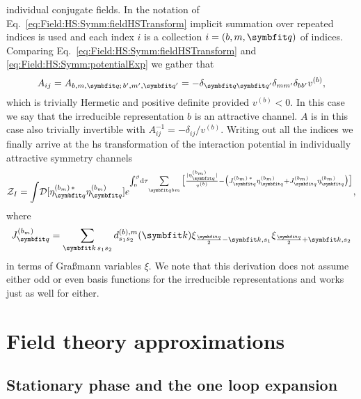 individual conjugate fields. In the notation of Eq.~\eqref{eq:Field:HS:Symm:fieldHSTransform} implicit summation over repeated indices is used and each index $i$ is a collection $i = (b,m,\v{q})$ of indices.
Comparing Eq.~\eqref{eq:Field:HS:Symm:fieldHSTransform} and \eqref{eq:Field:HS:Symm:potentialExp} we gather that
\begin{equation}
    \label{eq:Field:HS:Symm:Matrix}
    A_{ij} = A_{b,m,\v{q};\,b',m',\v{q}'} = -\delta_{\v{q}\v{q}'}\delta_{mm'}\delta_{bb'}v^{(b)},
\end{equation}
which is trivially Hermetic and positive definite provided $v^{(b)}<0$. In this case we say that the irreducible representation $b$ is an
attractive channel. $A$ is in this case also trivially invertible with $A_{ij}^{-1} = -\delta_{ij}/v^{(b)}$.
Writing out all the indices we finally arrive at the \ac{hs} transformation of the interaction potential in individually
attractive symmetry channels
\begin{equation}
    \label{eq:Field:HS:Symm:HSTransformedPotentialExp}
    \mathcal{Z}_I = \int\!\mathcal{D}[\eta_\v{q}^{(b_m)\,\ast}\eta_\v{q}^{(b_m)}]e^{\int_0^\beta\!\mathrm{d}\tau\!\sum\limits_{\v{q}bm}\big[\frac{|\eta_\v{q}^{(b_m)}|}{v^{(b)}} - \big(J_\v{q}^{(b_m)\,\ast}\eta_\v{q}^{(b_m)} + J_\v{q}^{(b_m)}\eta_\v{q}^{(b_m)}\big)\big]},
\end{equation}
where
\begin{equation}
    \label{eq:Field:HS:Symm:JRedef}
    J^{(b_m)}_\v{q} = \sum_{\v{k}\,s_1s_2}d_{s_1s_2}^{(b),m}(\v{k})\xi_{\frac{\v{q}}{2}-\v{k},s_1}\xi_{\frac{\v{q}}{2}+\v{k},s_2}
\end{equation}
in terms of Gra\ss mann variables $\xi$. We note that this derivation does not assume either odd or even basis functions for the
irreducible representations and works just as well for either.

\section{Field theory approximations}

\subsection{Stationary phase and the one loop expansion}

